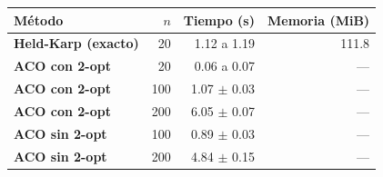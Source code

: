 \renewcommand{\arraystretch}{1.2}
\begin{tabular}{|l|r|r|r|}
\hline
\rowcolor{gray!20} \textbf{Método} & \textbf{$n$} & \textbf{Tiempo (s)} & \textbf{Memoria (MiB)} \\
\hline
\textbf{Held-Karp (exacto)} & 20 & 1.12 a 1.19 & 111.8 \\
\hline
\textbf{ACO con 2-opt} & 20 & 0.06 a 0.07 & --- \\
\hline
\textbf{ACO con 2-opt} & 100 & 1.07 $\pm$ 0.03 & --- \\
\hline
\textbf{ACO con 2-opt} & 200 & 6.05 $\pm$ 0.07 & --- \\
\hline
\textbf{ACO sin 2-opt} & 100 & 0.89 $\pm$ 0.03 & --- \\
\hline
\textbf{ACO sin 2-opt} & 200 & 4.84 $\pm$ 0.15 & --- \\
\hline
\end{tabular}
